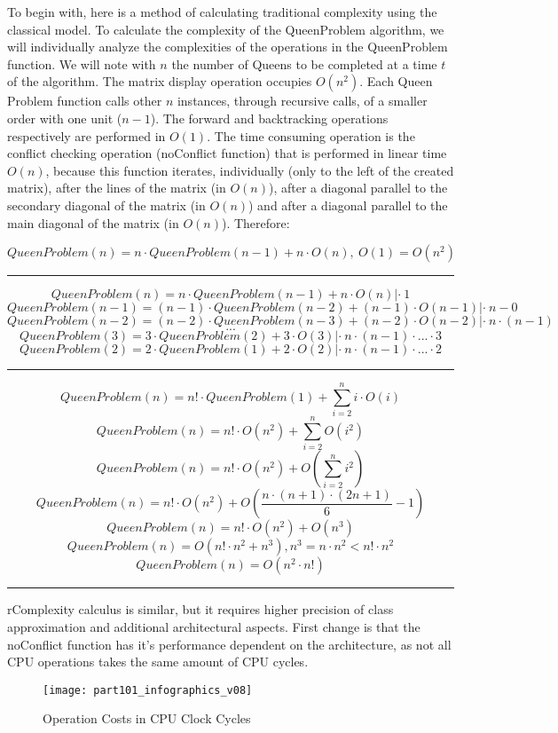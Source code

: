 To begin with, here is a method of calculating traditional complexity using the classical model.
To calculate the complexity of the QueenProblem algorithm, we will individually analyze the complexities of the operations in the QueenProblem function. We will note with $n$ the number of Queens to be completed at a time $ t $ of the algorithm.
The matrix display operation occupies $ O (n ^ 2) $.
Each Queen Problem function calls other $ n $ instances, through recursive calls, of a smaller order with one unit ($ n-1 $).
The forward and backtracking operations respectively are performed in $ O (1) $. The time consuming operation is the conflict checking operation (noConflict function) that is performed in linear time $ O (n) $, because this function iterates, individually (only to the left of the created matrix), after the lines of the matrix (in $ O (n) $), after a diagonal parallel to the secondary diagonal of the matrix (in $ O (n) $) and after a diagonal parallel to the main diagonal of the matrix (in $ O (n) $).
Therefore:

\[QueenProblem(n) = n \cdot QueenProblem(n-1) + n \cdot O(n),\ O(1)=O(n^2)\] 
\noindent\rule{16cm}{0.4pt}
\[QueenProblem(n) = n \cdot QueenProblem(n-1) + n \cdot O(n) |\cdot\ 1\]
\[QueenProblem(n-1) = (n-1) \cdot QueenProblem(n-2) + (n-1) \cdot O(n-1) |\cdot\ n-0\]
\[QueenProblem(n-2) = (n-2) \cdot QueenProblem(n-3) + (n-2) \cdot O(n-2) |\cdot\ n\cdot (n-1)\]
\[...\]
\[QueenProblem(3) = 3 \cdot QueenProblem(2) + 3 \cdot O(3) |\cdot\ n\cdot (n-1) \cdot ... \cdot 3\]
\[QueenProblem(2) = 2 \cdot QueenProblem(1) + 2 \cdot O(2) |\cdot\ n\cdot (n-1) \cdot ... \cdot 2\]
\noindent\rule{16cm}{0.4pt}
\[QueenProblem(n) = n! \cdot QueenProblem(1) + \sum_{i=2}^{n} i\cdot O(i)\]
\[QueenProblem(n) = n! \cdot O(n^2) + \sum_{i=2}^{n} O(i^2)\]
\[QueenProblem(n) = n! \cdot O(n^2) +  O(\sum_{i=2}^{n} i^2)\]
\[QueenProblem(n) = n! \cdot O(n^2) +  O(\dfrac{n\cdot(n+1)\cdot(2n+1)}{6} - 1)\]
\[QueenProblem(n) = n! \cdot O(n^2) +  O(n^3)\]
\[QueenProblem(n) = O(n! \cdot n^2 + n^3) , n^3 = n \cdot n^2 < n! \cdot n^2\]
\[QueenProblem(n) = O(n^2\cdot n!) \]
\noindent\rule{16cm}{0.4pt}

rComplexity calculus is similar, but it requires higher precision of class approximation and additional architectural aspects. 
First change is that the noConflict function has it's performance dependent on the architecture, as not all CPU operations takes the same amount of CPU cycles. 

\begin{figure}[H]
\centering
\texttt{[image: part101\_infographics\_v08]}
\caption{Operation Costs in CPU Clock Cycles\cite{archcost}}
\end{figure}

